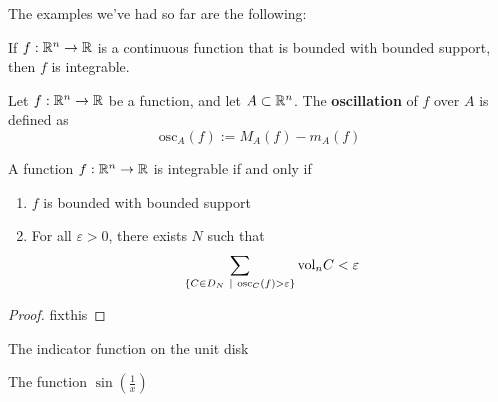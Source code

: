 The examples we've had so far are the following:
        
    \begin{theorem}
     If $f : \mathbb{R}^n \to \mathbb{R}$ is a continuous function that is bounded with bounded support, then $f$ is integrable.   
    \end{theorem}


    \begin{definition}
    Let $f: \mathbb{R}^n \to \mathbb{R}$ be a function, and let $A \subset \mathbb{R}^n$.  The \textbf{oscillation} of $f$ over $A$ is defined as $$\text{osc}_A(f) := M_A(f) - m_A(f)$$
    \end{definition}
    
    \begin{theorem}
    A function $f: \mathbb{R}^n \to \mathbb{R}$ is integrable if and only if
    \begin{enumerate}
        \item $f$ is bounded with bounded support
        \item For all $\varepsilon > 0$, there exists $N$ such that $$\sum_{\{C \in D_N \ | \ \text{osc}_C(f) > \varepsilon \}} \textnormal{vol}_n C < \varepsilon$$
    \end{enumerate}
    \end{theorem}

\begin{proof}
    fixthis
\end{proof}

\begin{example}
    The indicator function on the unit disk
\end{example}

\begin{example}

The function $\sin(\frac{1}{x})$
    
    
    
\end{example}

















